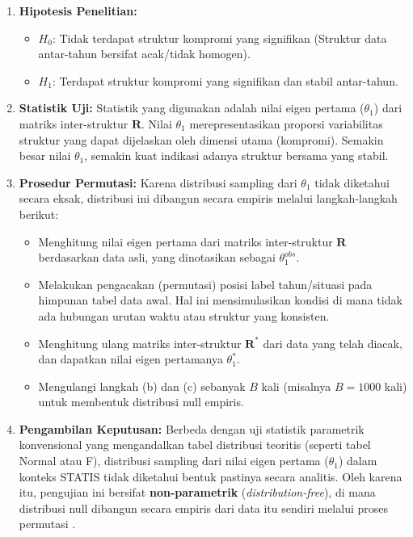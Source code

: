 \documentclass[a4paper]{article}
\theoremstyle{definition} %
\begin{document}
\begin{enumerate}
    \item \textbf{Hipotesis Penelitian:}
    \begin{itemize}
        \item $H_0$: Tidak terdapat struktur kompromi yang signifikan (Struktur data antar-tahun bersifat acak/tidak homogen).
        \item $H_1$: Terdapat struktur kompromi yang signifikan dan stabil antar-tahun.
    \end{itemize}
    
    \item \textbf{Statistik Uji:}
    Statistik yang digunakan adalah nilai eigen pertama ($\theta_1$) dari matriks inter-struktur $\mathbf{R}$. Nilai $\theta_1$ merepresentasikan proporsi variabilitas struktur yang dapat dijelaskan oleh dimensi utama (kompromi). Semakin besar nilai $\theta_1$, semakin kuat indikasi adanya struktur bersama yang stabil.
    
    \item \textbf{Prosedur Permutasi:}
    Karena distribusi sampling dari $\theta_1$ tidak diketahui secara eksak, distribusi ini dibangun secara empiris melalui langkah-langkah berikut:
    \begin{itemize}
        \item[a.] Menghitung nilai eigen pertama dari matriks inter-struktur $\mathbf{R}$ berdasarkan data asli, yang dinotasikan sebagai $\theta_1^{obs}$.
        \item[b.] Melakukan pengacakan (permutasi) posisi label tahun/situasi pada himpunan tabel data awal. Hal ini mensimulasikan kondisi di mana tidak ada hubungan urutan waktu atau struktur yang konsisten.
        \item[c.] Menghitung ulang matriks inter-struktur $\mathbf{R}^*$ dari data yang telah diacak, dan dapatkan nilai eigen pertamanya $\theta_1^*$.
        \item[d.] Mengulangi langkah (b) dan (c) sebanyak $B$ kali (misalnya $B=1000$ kali) untuk membentuk distribusi null empiris.
    \end{itemize}

    \item \textbf{Pengambilan Keputusan:}
    Berbeda dengan uji statistik parametrik konvensional yang mengandalkan tabel distribusi teoritis (seperti tabel Normal atau F), distribusi sampling dari nilai eigen pertama ($\theta_1$) dalam konteks STATIS tidak diketahui bentuk pastinya secara analitis. Oleh karena itu, pengujian ini bersifat \textbf{non-parametrik} (\textit{distribution-free}), di mana distribusi null dibangun secara empiris dari data itu sendiri melalui proses permutasi \citep{kazi1995}.
    

\end{enumerate}
\end{document}
